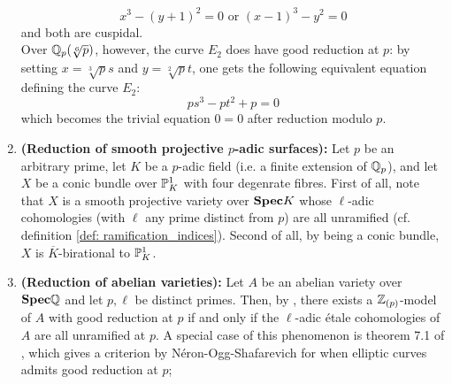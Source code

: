 \begin{example}
\begin{enumerate}
                                $$\text{$x^3 - (y + 1)^2 = 0$ or $(x - 1)^3 - y^2 = 0$}$$
                            and both are cuspidal.
                            \\
                            Over $\Q_p(\sqrt[6]{p})$, however, the curve $E_2$ does have good reduction at $p$: by setting $x = \sqrt[3]{p} s$ and $y = \sqrt[2]{p} t$, one gets the following equivalent equation defining the curve $E_2$:
                                $$ps^3 - pt^2 + p = 0$$
                            which becomes the trivial equation $0 = 0$ after reduction modulo $p$. 
                            \item \textbf{(Reduction of smooth projective $p$-adic surfaces):} Let $p$ be an arbitrary prime, let $K$ be a $p$-adic field (i.e. a finite extension of $\Q_p$), and let $X$ be a conic bundle over $\P^1_K$ with four degenrate fibres. First of all, note that $X$ is a smooth projective variety over $\Spec K$ whose $\ell$-adic cohomologies (with $\ell$ any prime distinct from $p$) are all unramified (cf. definition \ref{def: ramification_indices}). Second of all, by being a conic bundle, $X$ is $\overline{K}$-birational to $\P^1_K$. 
                            \item \textbf{(Reduction of abelian varieties):} Let $A$ be an abelian variety over $\Spec \Q$ and let $p, \ell$ be distinct primes. Then, by \cite[Theorem 1.1.1]{conradbrinon}, there exists a $\Z_{(p)}$-model of $A$ with good reduction at $p$ if and only if the $\ell$-adic \'etale cohomologies of $A$ are all unramified at $p$. A special case of this phenomenon is theorem 7.1 of \cite{silverman_elliptic_curves}, which gives a criterion by N\'eron-Ogg-Shafarevich for when elliptic curves admits good reduction at $p$;  
                        \end{enumerate}
                    \end{example}
                    
